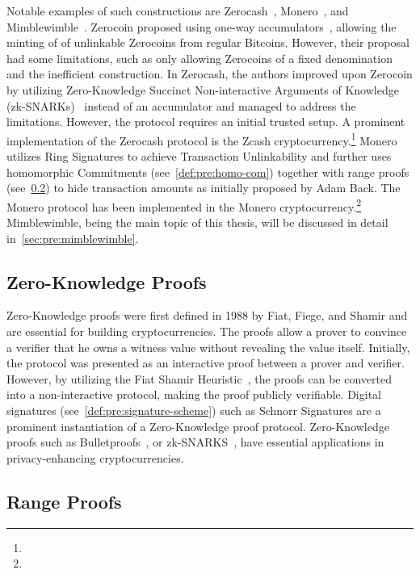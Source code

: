 Notable examples of such constructions are Zerocash~\cite{sasson2014zerocash}, Monero~\cite{noether2015ring}, and Mimblewimble~\cite{jedusor2016mimblewimble}.
Zerocoin proposed using one-way accumulators~\cite{benaloh1993one}, allowing the minting of of unlinkable Zerocoins from regular Bitcoins.
However, their proposal had some limitations, such as only allowing Zerocoins of a fixed denomination and the inefficient construction.
In Zerocash, the authors improved upon Zerocoin by utilizing Zero-Knowledge Succinct Non-interactive Arguments of Knowledge (zk-SNARKs)~\cite{bitansky2012extractable} instead of an accumulator and managed to address the limitations.
However, the protocol requires an initial trusted setup.
A prominent implementation of the Zerocash protocol is the Zcash cryptocurrency.\footnote{\urlzcash}
Monero utilizes Ring Signatures to achieve Transaction Unlinkability and further uses homomorphic Commitments (see~\cref{def:pre:homo-com}) together with range proofs (see~\cref{sec:pre:rangeproof}) to hide transaction amounts as initially proposed by Adam Back.
The Monero protocol has been implemented in the Monero cryptocurrency.\footnote{\urlmonero}
Mimblewimble, being the main topic of this thesis, will be discussed in detail in~\cref{sec:pre:mimblewimble}.

\subsection{Zero-Knowledge Proofs} \label{sec:pre:privacy:zeroknowlegde}

Zero-Knowledge proofs were first defined in 1988 by Fiat, Fiege, and Shamir and are essential for building cryptocurrencies.
The proofs allow a prover to convince a verifier that he owns a witness value without revealing the value itself.
Initially, the protocol was presented as an interactive proof between a prover and verifier.
However, by utilizing the Fiat Shamir Heuristic~\cite{feige1988zero}, the proofs can be converted into a non-interactive protocol, making the proof publicly verifiable.
Digital signatures (see~\cref{def:pre:signature-scheme}) such as Schnorr Signatures are a prominent instantiation of a Zero-Knowledge proof protocol.
Zero-Knowledge proofs such as Bulletproofs~\cite{bunz2018bulletproofs}, or zk-SNARKS~\cite{bitansky2012extractable}, have essential applications in privacy-enhancing cryptocurrencies.


\subsection{Range Proofs} \label{sec:pre:rangeproof}

